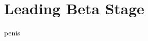 
\section{Leading Beta Stage}
penis

\begin{comment}
    - all infrastructure done, primarily around features
    - messages/updates
    - better graphics
    - AI
\end{comment}
